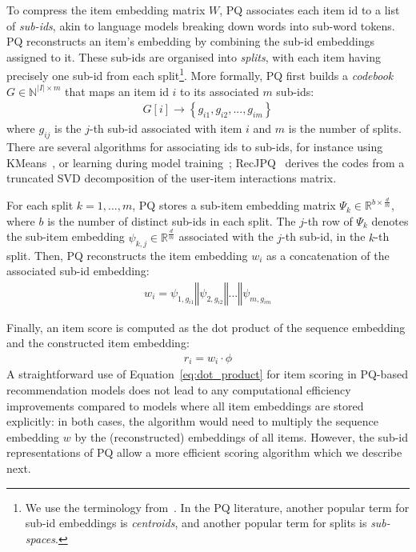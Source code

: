 \documentclass[sigconf,natbib=true, review=true]{acmart} %
\newcommand{\pageenlarge}[1]{\marginnote{#1}\enlargethispage{#1\baselineskip}}
\newcommand{\rsasha}[1]{\textcolor[HTML]{FF0000}{#1}}
\begin{document}
 To compress the item embedding matrix $W$, PQ associates each item id to a list of {\em sub-ids}, akin to language models breaking down words into sub-word tokens. PQ reconstructs an item's embedding by combining the sub-id embeddings assigned to it. These sub-ids are organised into {\em splits}, with each item having precisely one sub-id from each split\footnote{We use the terminology from~\cite{petrovRecJPQTrainingLargeCatalogue2024}. In the PQ literature, another popular term for sub-id embeddings is \emph{centroids}, and another popular term for splits is \emph{sub-spaces}.}. More formally, PQ first builds a \emph{codebook} $G\in\mathbb{N}^{|I|\times m}$ that maps an item id $i$ to its associated $m$ sub-ids:
\begin{align}
    G[i] \rightarrow \left\{g_{i1}, g_{i2}, ..., g_{im}\right\} \label{eq:sub_ids_map}
\end{align}
where $g_{ij}$ is the $j$-th sub-id associated with item $i$ and $m$ is the number of splits. There are several algorithms for associating ids to sub-ids, for instance using KMeans~\citemissing{}, or learning during model training~\cite{chenDifferentiableProductQuantization2020}; 
RecJPQ~\cite{petrovRecJPQTrainingLargeCatalogue2024} derives the codes from a truncated SVD decomposition of the user-item interactions matrix. 

For each split $k=1,\ldots,m$, PQ stores a sub-item embedding matrix $\Psi_k \in \mathbb{R}^{b\times\frac{d}{m}}$, where $b$ is the number of distinct sub-ids in each split. The $j$-th row of $\Psi_k$ denotes the sub-item embedding $\psi_{k,j} \in \mathbb{R}^{\frac{d}{m}}$ associated with the $j$-th sub-id, in the $k$-th split.
Then, PQ reconstructs the item embedding $w_i$ as a concatenation of the associated sub-id embedding: 
\begin{align}
    w_i =  \psi_{1,g_{i1}} \mathbin\Vert \psi_{2,g_{i2}}  \mathbin\Vert ... \mathbin\Vert  \psi_{m,g_{im}} \label{eq:pq:item_embedding}
\end{align}

Finally, an item score is computed as the dot product of the sequence embedding and the constructed item embedding: 
\begin{align}
    r_i = w_i \cdot \phi\label{eq:dot_product}
\end{align}
 A straightforward use of Equation~\eqref{eq:dot_product} for item scoring in PQ-based recommendation models does not lead to any computational efficiency improvements compared to models where all item embeddings are stored explicitly: \rsasha{in both cases, the algorithm would need to multiply the sequence embedding $w$  by the (reconstructed) embeddings of all items.}
However, \rsasha{the sub-id representations of} PQ \rsasha{allow} a more efficient scoring algorithm \rsasha{which we describe next}. 
\end{document}
